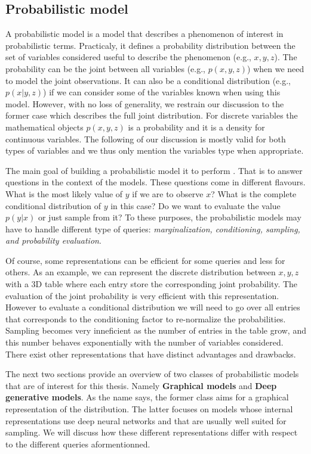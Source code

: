 \subsection{Probabilistic model}
A probabilistic model is a model that describes a phenomenon of interest in probabilistic terms. Practicaly, it defines a probability distribution between the set of variables considered useful to describe the phenomenon (e.g., $x, y, z$). The probability can be the joint between all variables (e.g., $p(x, y, z)$) when we need to model the joint observations. It can also be a conditional distribution  (e.g., $p(x | y, z)$) if we can consider some of the variables known when using this model. However, with no loss of generality, we restrain our discussion to the former case which describes the full joint distribution. For discrete variables the mathematical objects $p(x, y, z)$ is a probability and it is a density for continuous variables. The following of our discussion is mostly valid for both types of variables and we thus only mention the variables type when appropriate.

The main goal of building a probabilistic model it to perform . That is to answer questions in the context of the models. These questions come in different flavours. What is the most likely value of $y$ if we are to observe $x$? What is the complete conditional distribution of $y$ in this case? Do we want to evaluate the value $p(y|x)$ or just sample from it? To these purposes, the probabilistic models may have to handle different type of queries: \textit{marginalization, conditioning, sampling, and probability evaluation}.

Of course, some representations can be efficient for some queries and less for others. As an example, we can represent the discrete distribution between $x, y, z$ with a $3$D table where each entry store the corresponding joint probability. The evaluation of the joint probability is very efficient with this representation. However to evaluate a conditional distribution we will need to go over all entries that corresponds to the conditioning factor to re-normalize the probabilities. Sampling becomes very inneficient as the number of entries in the table grow, and this number behaves exponentially with the number of variables considered. There exist other representations that have distinct advantages and drawbacks.

The next two sections provide an overview of two classes of probabilistic models that are of interest for this thesis. Namely \textbf{Graphical models} and \textbf{Deep generative models}. As the name says, the former class aims for a graphical representation of the distribution. The latter focuses on models whose internal representations use deep neural networks and that are usually well suited for sampling. We will discuss how these different representations differ with respect to the different queries aformentionned.

